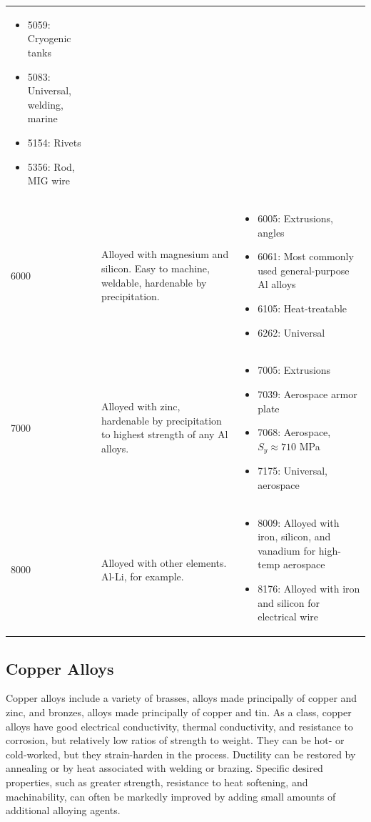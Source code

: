 \documentclass[
10pt,
a4paper,
openany,
svgnames,
]{book}
\begin{document}
\begin{table}[H]
\begin{tabular}{lp{6cm}p{6cm}}
\begin{itemize}
    \item 5059: Cryogenic tanks
    \item 5083: Universal, welding, marine
    \item 5154: Rivets
    \item 5356: Rod, MIG wire
    \end{itemize} \\
    6000 & Alloyed with magnesium and silicon. Easy to machine, weldable, hardenable by precipitation. & \begin{itemize}
    \item 6005: Extrusions, angles
    \item 6061: Most commonly used general-purpose Al alloys
    \item 6105: Heat-treatable
    \item 6262: Universal 
    \end{itemize} \\
    7000 & Alloyed with zinc, hardenable by precipitation to highest strength of any Al alloys. & \begin{itemize}
    \item 7005: Extrusions
    \item 7039: Aerospace armor plate
    \item 7068: Aerospace, $S_y \approx 710$ MPa
    \item 7175: Universal, aerospace
    \end{itemize} \\
    8000 & Alloyed with other elements. Al-Li, for example. & \begin{itemize}
    \item 8009: Alloyed with iron, silicon, and vanadium for high-temp aerospace
    \item 8176: Alloyed with iron and silicon for electrical wire
    \end{itemize} \\
    \bottomrule
  \end{tabular}
  \label{tab: alum alloy description}
\end{table}

\subsection{Copper Alloys}

Copper alloys include a variety of brasses, alloys made principally of copper and zinc, and bronzes, alloys made principally of copper and tin. As a class, copper alloys have good electrical conductivity, thermal conductivity, and resistance to corrosion, but relatively low ratios of strength to weight. They can be hot- or cold-worked, but they strain-harden in the process. Ductility can be restored by annealing or by heat associated with welding or brazing. Specific desired properties, such as greater strength, resistance to heat softening, and machinability, can often be markedly improved by adding small amounts of additional alloying agents.
\end{document}
